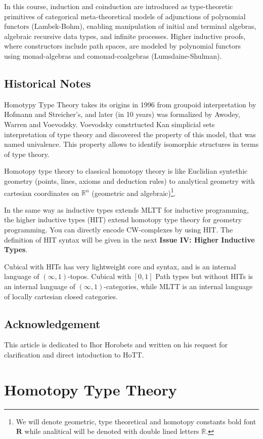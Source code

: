 \documentclass{article}
\begin{document}
In this course, induction and coinduction are introduced as type-theoretic
primitives of categorical meta-theoretical models of adjunctions of
polynomial functors (Lambek-Bohm), enabling manipulation of initial
and terminal algebras, algebraic recursive data types, and infinite
processes. Higher inductive proofs, where constructors include path
spaces, are modeled by polynomial functors using monad-algebras and
comonad-coalgebras (Lumsdaine-Shulman).

\subsection*{Historical Notes}
Homotypy Type Theory takes its origins in 1996 from groupoid interpretation by
Hofmann and Streicher's, and later (in 10 years) was formalized by Awodey,
Warren and Voevodsky. Voevodsky constrtucted Kan simplicial sets interpretation
of type theory and discovered the property of this model, that was named univalence.
This property allows to identify isomorphic structures in terms of type theory.

Homotopy type theory to classical homotopy theory is like Euclidian
syntethic geometry (points, lines, axioms and deduction rules) to
analytical geometry with cartesian coordinates on $\mathbb{R}^n$ (geometric and algebraic)\footnote{We will denote geometric, type theoretical and homotopy constants
bold font $\mathbf{R}$ while analitical will be denoted with double lined letters $\mathbb{R}$.}.

In the same way as inductive types extends MLTT for inductive programming,
the higher inductive types (HIT) extend homotopy type theory for geometry programming.
You can directly encode CW-complexes by using HIT. The definition of HIT syntax will
be given in the next {\bf Issue IV: Higher Inductive Types}.

Cubical with HITs has very lightweight core and syntax, and
is an internal language of $(\infty,1)$-topos.
Cubical with $[0,1]$ Path types but without HITs is an
internal language of $(\infty,1)$-categories, while MLTT
is an internal language of locally cartesian closed categories.

\subsection*{Acknowledgement}
This article is dedicated to Ihor Horobets and written on his
request for clarification and direct intoduction to HoTT.

\newpage
\section{Homotopy Type Theory}
\end{document}
